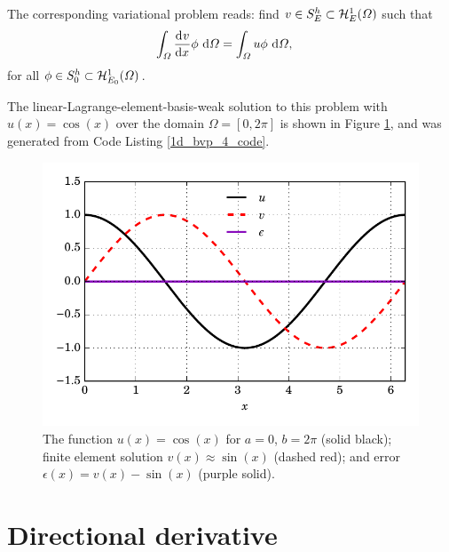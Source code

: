   The corresponding variational problem reads: find $v \in S_E^h \subset \mathcal{H}_E^1(\varOmega)$ such that
  \begin{align*}
    \int_{\varOmega} \frac{\mathrm{d}^{} v}{\mathrm{d} x^{} } \phi \ \mathrm{d}\varOmega &= \int_{\varOmega} u \phi \ \mathrm{d}\varOmega,
  \end{align*}
  for all $\phi \in S_0^h \subset \mathcal{H}_{E_0}^1(\varOmega)$.
  
  The linear-Lagrange-element-basis-weak solution to this problem with $u(x) = \cos(x)$ over the domain $\Omega = [0,2\pi]$ is shown in Figure \ref{1d_bvp_4_image}, and was generated from Code Listing \ref{1d_bvp_4_code}. 

  
  \begin{figure}
    \centering
      \includegraphics[width=\linewidth]{images/fenics_intro/1D_BVP_4.pdf}
    \caption[BVP example two solution]{The function $u(x) = \cos(x)$ for $a=0$, $b=2\pi$ (solid black); finite element solution $v(x) \approx \sin(x)$ (dashed red); and error $\epsilon(x) = v(x) - \sin(x)$ (purple solid).}
    \label{1d_bvp_4_image}
  \end{figure}

  
  \section{Directional derivative} \label{ssn_intro_directional_deriavative}
 

